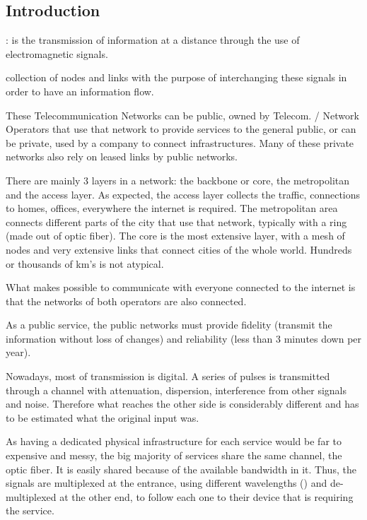 \subsection{Introduction}

\hspace{-.2cm} :  is the transmission of information at a distance through the use of electromagnetic signals.

 collection of nodes and links with the purpose of interchanging these signals in order to have an information flow.

These Telecommunication Networks can be public, owned by Telecom. / Network Operators that use that network to provide services to the general public, or can be private, used by a company to connect infrastructures. Many of these private networks also rely on leased links by public networks.

There are mainly 3 layers in a network: the backbone or core, the metropolitan and the access layer. As expected, the access layer collects the traffic, connections to homes, offices, everywhere the internet is required. The metropolitan area connects different parts of the city that use that network, typically with a ring (made out of optic fiber). The core is the most extensive layer, with a mesh of nodes and very extensive links that connect cities of the whole world. Hundreds or thousands of km's is not atypical.

What makes possible to communicate with everyone connected to the internet is that the networks of both operators are also connected.

As a public service, the public networks must provide fidelity (transmit the information without loss of changes) and reliability (less than 3 minutes down per year).


\vspace{.5cm}

Nowadays, most of transmission is digital. A series of pulses is transmitted through a channel with attenuation, dispersion, interference from other signals and noise. Therefore what reaches the other side is considerably different and has to be estimated what the original input was.


As having a dedicated physical infrastructure for each service would be far to expensive and messy, the big majority of services share the same channel, the optic fiber. It is easily shared because of the available bandwidth in it. Thus, the signals are multiplexed at the entrance, using different wavelengths () and de-multiplexed at the other end, to follow each one to their device that is requiring the service. 

